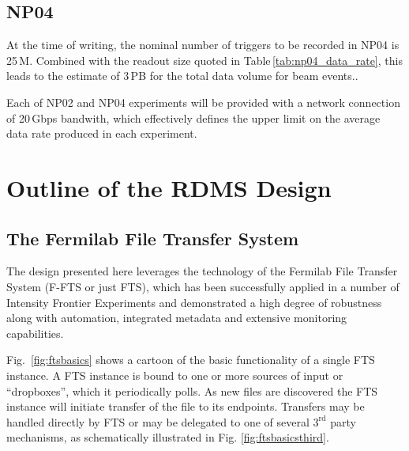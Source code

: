 \documentclass[12pt]{article}
\newcommand{\pd}{protoDUNE\xspace}
\begin{document}
\subsection{NP04}
At the time of writing, the nominal number of triggers to be recorded in NP04 is 25\,M.
Combined with the readout size quoted in Table\,\ref{tab:np04_data_rate}, this leads to
the estimate of 3\,PB for the total data volume for beam events..

Each of NP02 and NP04 experiments will be provided with a network connection of 20\,Gbps
bandwith, which effectively defines the upper limit on the average data rate
produced in each experiment.



\section{Outline of the RDMS Design}


\subsection{The Fermilab File Transfer System}
The design presented here leverages the technology of the Fermilab
File Transfer System (F-FTS or just FTS), which has been successfully
applied in a number of Intensity Frontier Experiments and demonstrated
a high degree of robustness along with automation, integrated metadata
and extensive monitoring capabilities.

Fig.~\ref{fig:ftsbasics} shows a cartoon of the basic functionality
of a single FTS instance.  A FTS instance is bound to one or more
sources of input or ``dropboxes'', which it  periodically polls.
As new files are discovered the FTS instance will initiate transfer of the file to its endpoints.
Transfers may be handled directly by FTS or may be delegated to one of
several $3^\mathrm{rd}$ party mechanisms, as schematically illustrated
in  Fig. \ref{fig:ftsbasicsthird}.
\end{document}
